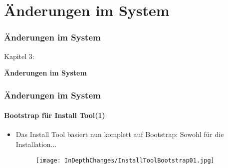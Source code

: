%

\section{Änderungen im System}
\begin{frame}[fragile]
	\frametitle{Änderungen im System}

	\begin{center}\huge{Kapitel 3:}\end{center}
	\begin{center}\huge{\color{typo3darkgrey}\textbf{Änderungen im System}}\end{center}

\end{frame}


\begin{frame}[fragile]
	\frametitle{Änderungen im System}
	\framesubtitle{Bootstrap für Install Tool(1)}

	\begin{itemize}

		\item Das Install Tool basiert nun komplett auf Bootstrap: Sowohl für die Installation...

			\begin{figure}
				\texttt{[image: InDepthChanges/InstallToolBootstrap01.jpg]}
			\end{figure}

	\end{itemize}

\end{frame}

